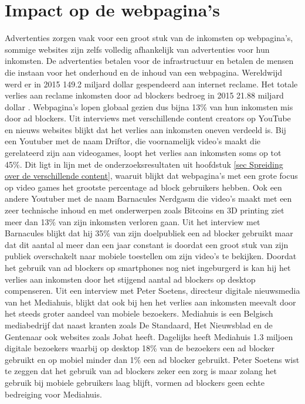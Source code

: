 \documentclass[pdftex,a4paper,12pt,twoside]{report}
\begin{document}
\section{Impact op de webpagina's}
\label{sec:Impact op de webpagina's}
Advertenties zorgen vaak voor een groot stuk van de inkomsten op webpagina's, sommige websites zijn zelfs volledig afhankelijk van advertenties voor hun inkomsten. De advertenties betalen voor de infrastructuur en betalen de mensen die instaan voor het onderhoud en de inhoud van een webpagina. Wereldwijd werd er in 2015 149.2 miljard dollar gespendeerd aan internet reclame. Het totale verlies aan reclame inkomsten door ad blockers bedroeg in 2015 21.88 miljard dollar \cite{PageFair2015}. Webpagina's lopen globaal gezien dus bijna 13\% van hun inkomsten mis door ad blockers. Uit interviews met verschillende content creators op YouTube en nieuws websites blijkt dat het verlies aan inkomsten oneven verdeeld is. Bij een Youtuber met de naam Driftor, die voornamelijk video's maakt die gerelateerd zijn aan videogames, loopt het verlies aan inkomsten soms op tot 45\%. Dit ligt in lijn met de onderzoeksresultaten uit hoofdstuk \ref{sec Spreiding over de verschillende content}, waaruit blijkt dat webpagina's met een grote focus op video games het grootste percentage ad block gebruikers hebben. Ook een andere Youtuber met de naam Barnacules Nerdgasm die video's maakt met een zeer technische inhoud en met onderwerpen zoals Bitcoins en 3D printing ziet meer dan 13\% van zijn inkomsten verloren gaan. Uit het interview met Barnacules blijkt dat hij 35\% van zijn doelpubliek een ad blocker gebruikt maar dat dit aantal al meer dan een jaar constant is doordat een groot stuk van zijn publiek overschakelt naar mobiele toestellen om zijn video's te bekijken. Doordat het gebruik van ad blockers op smartphones nog niet ingeburgerd is kan hij het verlies aan inkomsten door het stijgend aantal ad blockers op desktop compenseren.
Uit een interview met Peter Soetens, directeur digitale nieuwsmedia van het Mediahuis, blijkt dat ook bij hen het verlies aan inkomsten meevalt door het steeds groter aandeel van mobiele bezoekers. Mediahuis is een Belgisch mediabedrijf dat naast kranten zoals De Standaard, Het Nieuwsblad en de Gentenaar ook websites zoals Jobat heeft. Dagelijks heeft Mediahuis 1.3 miljoen digitale bezoekers waarbij op desktop 18\% van de bezoekers een ad blocker gebruikt en op mobiel minder dan 1\% een ad blocker gebruikt. Peter Soetens wist te zeggen dat het gebruik van ad blockers zeker een zorg is maar zolang het gebruik bij mobiele gebruikers laag blijft, vormen ad blockers geen echte bedreiging voor Mediahuis.
\end{document}
